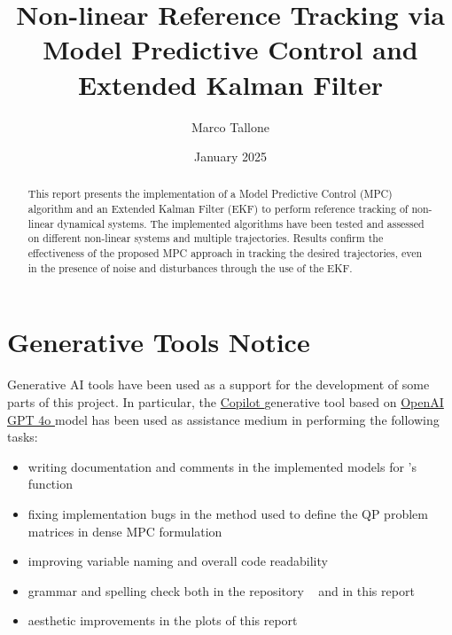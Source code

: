 \documentclass{settings/notex}
\title{Non-linear Reference Tracking via\\
	Model Predictive Control and Extended Kalman Filter\\
  \vspace{0.5cm}
  \fontsize{12pt}{12pt}\selectfont{
    Modelling and Control of Cyber-Physical Systems II\\
    \vspace{0.25cm}
    University of Trieste (UniTS)
  }
}
\author{Marco Tallone}
\date{January 2025}
\begin{document}
\maketitle

\begin{abstract}
\noindent
This report presents the implementation of a Model Predictive Control (MPC)
algorithm and an Extended Kalman Filter (EKF) to perform reference tracking of
non-linear dynamical systems. The implemented algorithms have been tested and assessed on different non-linear systems and multiple
trajectories. Results confirm the effectiveness of the proposed MPC approach in
tracking the desired trajectories, even in the presence of noise and
disturbances through the use of the EKF.
\end{abstract}










\pagebreak



\vspace{1cm}

\section*{Generative Tools Notice}

Generative AI tools have been used as a support for the development of some
parts of this
project. In particular, the
\href{https://en.wikipedia.org/wiki/Microsoft_Copilot}{Copilot \faLink} generative tool
based on \href{https://en.wikipedia.org/wiki/GPT-4}{OpenAI GPT 4o \faLink} model has
been used as assistance medium in performing the following tasks:

\begin{itemize}
	 \item writing documentation and comments in the implemented models for
		 's  function

	\item fixing implementation bugs in the 
		method used to define the QP problem matrices in dense MPC formulation

	 \item improving variable naming and overall code readability

	\item grammar and spelling check both in the repository
		~\cite{github} and in this report

	\item aesthetic improvements in the plots of this report

\end{itemize}
\end{document}
